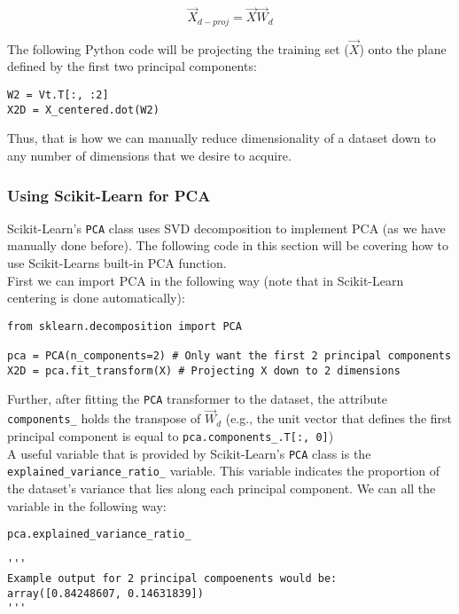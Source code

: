 $$\vec{X}_{d-proj} = \vec{X} \vec{W}_{d}$$

\noindent
The following Python code will be projecting the training set ($\vec{X}$) onto the plane defined by the first two
principal components:

\begin{verbatim}
W2 = Vt.T[:, :2]
X2D = X_centered.dot(W2)
\end{verbatim}

\noindent
Thus, that is how we can manually reduce dimensionality of a dataset down to any number of dimensions that we desire to
acquire.

\subsubsection*{Using Scikit-Learn for PCA}

Scikit-Learn's \texttt{PCA} class uses SVD decomposition to implement PCA (as we have manually done before).
The following code in this section will be covering how to use Scikit-Learns built-in PCA function.\\

\noindent
First we can import PCA in the following way (note that in Scikit-Learn centering is done automatically):

\begin{verbatim}
from sklearn.decomposition import PCA

pca = PCA(n_components=2) # Only want the first 2 principal components
X2D = pca.fit_transform(X) # Projecting X down to 2 dimensions
\end{verbatim}

\noindent
Further, after fitting the \texttt{PCA} transformer to the dataset, the attribute \texttt{components_}
holds the transpose of $\vec{W}_{d}$ (e.g., the unit vector that defines the first principal component is equal to 
\texttt{pca.components_.T[:, 0]}) \\

\noindent
A useful variable that is provided by Scikit-Learn's \texttt{PCA} class is the \texttt{explained_variance_ratio_}
variable. This variable indicates the proportion of the dataset's variance that lies along each principal component.
We can all the variable in the following way:

\begin{verbatim}
pca.explained_variance_ratio_

'''
Example output for 2 principal compoenents would be:
array([0.84248607, 0.14631839])
'''
\end{verbatim}

